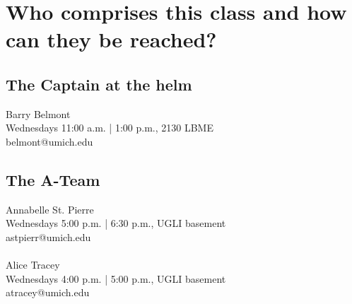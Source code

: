 \documentclass[11pt]{book}
\begin{document}
\newpage



\section{Who comprises this class and how can they be reached?}
\subsection{The Captain at the helm}
Barry Belmont \\ Wednesdays 11:00 a.m. | 1:00 p.m., 2130 LBME \\ belmont@umich.edu \\
\subsection{The A-Team}
Annabelle St. Pierre \\ Wednesdays 5:00 p.m. | 6:30 p.m., UGLI basement \\ astpierr@umich.edu \\
\\
Alice Tracey \\ Wednesdays 4:00 p.m. | 5:00 p.m., UGLI basement \\ atracey@umich.edu \\
\end{document}
